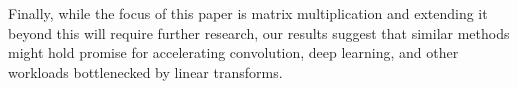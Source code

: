 \documentclass{article}  %
\begin{document}

Finally, while the focus of this paper is matrix multiplication and extending it beyond this will require further research, our results suggest that similar methods might hold promise for accelerating convolution, deep learning, and other workloads bottlenecked by linear transforms.








% 
% 
% 

% 




\clearpage
\newpage  %
\appendix

\end{document}
